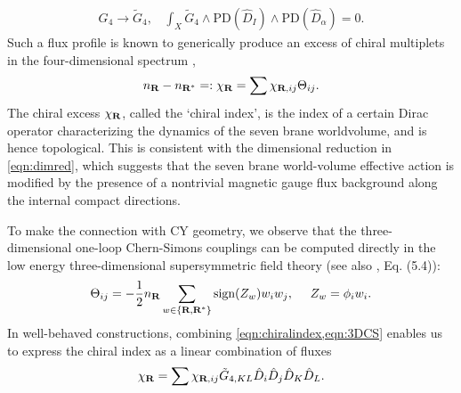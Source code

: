 \documentclass[11pt,oneside,english]{article}
\numberwithin{equation}{section}
\theoremstyle{definition}
\begin{document}
	\begin{align}
	\label{eqn:Flift}
	 G_4 \rightarrow \tilde G_4,~~~~ \int_{X} \tilde G_4 \wedge \text{PD}(\hat D_I) \wedge \text{PD}(\hat D_\alpha) = 0.
	\end{align} 
Such a flux profile is known to generically produce an excess of chiral multiplets in the four-dimensional spectrum \cite{Donagi:2008ca,Braun:2011zm,Marsano:2011hv,Krause:2011xj,Grimm:2011fx}, 
	\begin{align}
	\label{eqn:chiralindex}
		 n_{\textbf R} - n_{\textbf R^*} =: \chi_{\textbf R} = \sum\chi_{\textbf R,ij} \Theta_{ij}.
	\end{align}
The chiral excess $\chi_{\textbf R}$, called the `chiral index', is the index of a certain Dirac operator characterizing the dynamics of the seven brane worldvolume, and is hence topological. This is consistent with the dimensional reduction in \cref{eqn:dimred}, which suggests that the seven brane world-volume effective action is modified by the presence of a nontrivial magnetic gauge flux background along the internal compact directions. 

To make the connection with CY geometry, we observe that the three-dimensional one-loop Chern-Simons couplings can be computed directly in the low energy three-dimensional supersymmetric field theory \cite{Cvetic:2012xn} (see also \cite{Jefferson:2021bid}, Eq. (5.4)):
	\begin{align}
	\label{eqn:3DCScoupling}
		\Theta_{ij}= -\frac{1}{2} n_{\textbf R}\sum_{w \in \{ \textbf R, \textbf R^*\}} \text{sign}(Z_w) w_i w_j, ~~~~Z_w = \phi_i w_i. 
	\end{align}
In well-behaved constructions, combining \cref{eqn:chiralindex,eqn:3DCS} enables us to express the chiral index as a linear combination of fluxes
	\begin{align}
	\label{eqn:3DCSmatch}
	\begin{split}
		\chi_{\textbf R} =\sum \chi_{\textbf{R},{ij}} \tilde G_{4,KL} \hat D_i  \hat D_j  \hat D_K  \hat D_L.
	\end{split}
	\end{align}	
\end{document}
